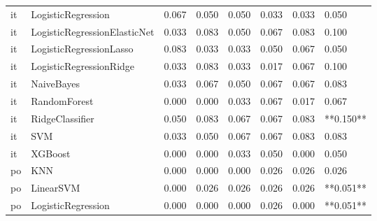 \begin{tabular}{llllllll}
      it &           LogisticRegression & 0.067 &                     0.050 &                 0.050 &                  0.033 &                                   0.033 &     0.050 \\
      it & LogisticRegressionElasticNet & 0.033 &                     0.083 &                 0.050 &                  0.067 &                                   0.083 &     0.100 \\
      it &      LogisticRegressionLasso & 0.083 &                     0.033 &                 0.033 &                  0.050 &                                   0.067 &     0.050 \\
      it &      LogisticRegressionRidge & 0.033 &                     0.083 &                 0.033 &                  0.017 &                                   0.067 &     0.100 \\
      it &                   NaiveBayes & 0.033 &                     0.067 &                 0.050 &                  0.067 &                                   0.067 &     0.083 \\
      it &                 RandomForest & 0.000 &                     0.000 &                 0.033 &                  0.067 &                                   0.017 &     0.067 \\
      it &              RidgeClassifier & 0.050 &                     0.083 &                 0.067 &                  0.067 &                                   0.083 & **0.150** \\
      it &                          SVM & 0.033 &                     0.050 &                 0.067 &                  0.067 &                                   0.083 &     0.083 \\
      it &                      XGBoost & 0.000 &                     0.000 &                 0.033 &                  0.050 &                                   0.000 &     0.050 \\
      po &                          KNN & 0.000 &                     0.000 &                 0.000 &                  0.026 &                                   0.026 &     0.026 \\
      po &                    LinearSVM & 0.000 &                     0.026 &                 0.026 &                  0.026 &                                   0.026 & **0.051** \\
      po &           LogisticRegression & 0.000 &                     0.000 &                 0.000 &                  0.026 &                                   0.000 & **0.051** \\

\end{tabular}
